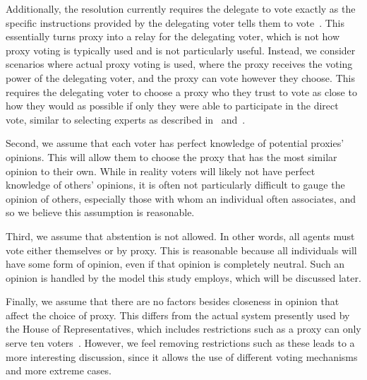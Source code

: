 Additionally, the resolution currently requires the delegate to vote exactly as the
specific instructions provided by the delegating voter tells them to
vote~\cite{CERP2020, Congress.gov2020}.
This essentially turns proxy into a relay for the delegating voter, which is not how
proxy voting is typically used and is not particularly useful.
Instead, we consider scenarios where actual proxy voting is used, where the proxy
receives the voting power of the delegating voter, and the proxy can vote
however they choose.
This requires the delegating voter to choose a proxy who they trust to vote as close
to how they would as possible if only they were able to participate in the direct vote,
similar to selecting experts as described in~\cite{Miller1969} and~\cite{Mueller1972}.

Second, we assume that each voter has perfect knowledge of potential proxies' opinions.
This will allow them to choose the proxy that has the most similar opinion to their own.
While in reality voters will likely not have perfect knowledge of others' opinions,
it is often not particularly difficult to gauge the opinion of others, especially
those with whom an individual often associates, and so we believe this assumption is
reasonable.

Third, we assume that abstention is not allowed.
In other words, all agents must vote either themselves or by proxy.
This is reasonable because all individuals will have some form of opinion, even if
that opinion is completely neutral.
Such an opinion is handled by the model this study employs, which will be discussed
later.

Finally, we assume that there are no factors besides closeness in opinion that affect
the choice of proxy.
This differs from the actual system presently used by the House of Representatives,
which includes restrictions such as a proxy can only serve ten voters~\cite{CERP2020}.
However, we feel removing restrictions such as these leads to a more interesting
discussion, since it allows the use of different voting mechanisms and more extreme
cases.



